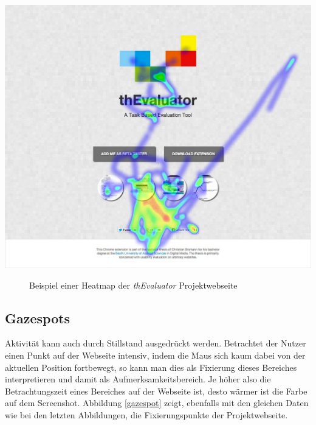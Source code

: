 \vspace{0.3cm}
\begin{center}
\includegraphics[scale=0.35]{./images/heatmap}
\end{center}
\begin{figure}[htb]
   \centering
   \caption{Beispiel einer Heatmap der \textit{thEvaluator} Projektwebseite}
    \label{heatmap}
\end{figure}


\subsection{Gazespots}

Aktivität kann auch durch Stillstand ausgedrückt werden. Betrachtet der Nutzer einen Punkt auf der Webseite intensiv, indem die Maus sich kaum dabei von der aktuellen Position fortbewegt, so kann man dies als Fixierung dieses Bereiches interpretieren und damit als Aufmerksamkeitsbereich. Je höher also die Betrachtungszeit eines Bereiches auf der Webseite ist, desto wärmer ist die Farbe auf dem Screenshot. Abbildung \ref{gazespot} zeigt, ebenfalls mit den gleichen Daten wie bei den letzten Abbildungen, die Fixierungspunkte der Projektwebseite.

